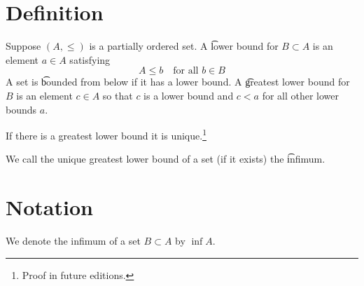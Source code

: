 

\section*{Definition}

Suppose $(A, \leq)$ is a partially ordered set.
A \t{lower bound} for $B \subset A$ is an element $a \in A$ satisfying
    \[
A \leq b \quad \text{for all } b \in B
    \]
A set is \t{bounded from below} if it has a lower bound.
A \t{greatest lower bound} for $B$ is an element $c \in A$ so that $c$ is a lower bound and $c < a$ for all other lower bounds $a$.

\begin{proposition}
If there is a greatest lower bound it is unique.\footnote{Proof in future editions.}\end{proposition}
We call the unique greatest lower bound of a set (if it exists) the \t{infimum}.

\section*{Notation}

We denote the infimum of a set $B \subset A$ by $\inf A$.

\blankpage